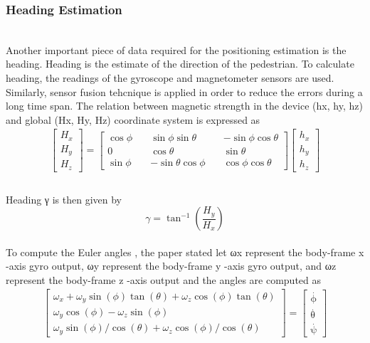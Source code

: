 \documentclass{l4proj}
\begin{document}
\subsubsection{Heading Estimation}~\\
Another important piece of data required for the positioning estimation is the heading. Heading is the estimate of the direction of the pedestrian. To calculate heading, the readings of the gyroscope and magnetometer sensors are used. Similarly, sensor fusion tehcnique is applied in order to reduce the errors during a long time span. The relation between magnetic strength in the device (hx, hy, hz) and global (Hx, Hy, Hz) coordinate system is expressed as
\begin{align*} \left [{ \begin{array}{l} {H_{x}}\\ {H_{y}}\\ {H_{z}} \end{array} }\right] = \left [{ {\begin{array}{*{20}{c}} {\cos \phi }&\quad {\sin \phi \sin \theta }&\quad { - \sin \phi \cos \theta }\\ 0&\quad {\cos \theta }&\quad {\sin \theta }\\ {\sin \phi }&\quad { - \sin \theta \cos \phi }&\quad {\cos \phi \cos \theta } \end{array}} }\right]\left [{ \begin{array}{l} {h_{x}}\\ {h_{y}}\\ {h_{z}} \end{array} }\right]\!\!\!\!\! \\\tag{19}\end{align*}\\
Heading γ is then given by\begin{equation*} \gamma = {\tan ^{ - 1}}\left ({{\frac {H_{y}}{H_{x}}} }\right) \tag{20}\end{equation*}\\
To compute the Euler angles \cite{eulerangle}, the paper stated let ωx represent the body-frame x -axis gyro output, ωy represent the body-frame y -axis gyro output, and ωz represent the body-frame z -axis output and the angles are computed as
\begin{align*} \left [{ {\begin{array}{*{21}{c}} {\omega _{x} + {\omega _{y}}\sin (\phi)\tan (\theta) + {\omega _{z}}\cos (\phi)\tan (\theta)}\\ {\omega _{y}\cos (\phi) - {\omega _{z}}\sin (\phi)}\\ {\omega _{y}\sin (\phi)/\cos (\theta) + {\omega _{z}}\cos (\phi)/\cos (\theta)} \end{array}} }\right] = \left [{ {\begin{array}{*{22}{c}} {\mathop \phi \limits ^{.} }\\ {\mathop \theta \limits ^{.} }\\ {\mathop \psi \limits ^{.} } \end{array}} }\right] \\\tag{21}\end{align*}\\
\end{document}
